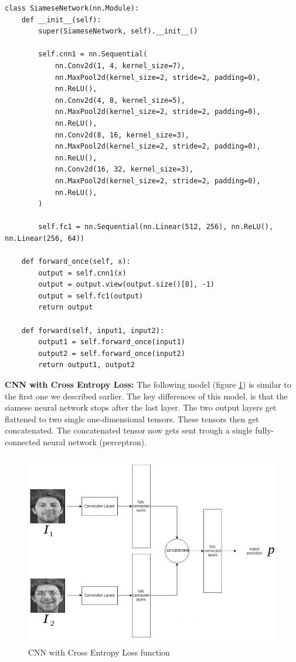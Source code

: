 \begin{lstlisting}[caption={Code for CNN with Contrastive Loss}, label={lst:cnncl}, frame=single, breaklines=true]
class SiameseNetwork(nn.Module):
    def __init__(self):
        super(SiameseNetwork, self).__init__()

        self.cnn1 = nn.Sequential(
            nn.Conv2d(1, 4, kernel_size=7),
            nn.MaxPool2d(kernel_size=2, stride=2, padding=0),
            nn.ReLU(),
            nn.Conv2d(4, 8, kernel_size=5),
            nn.MaxPool2d(kernel_size=2, stride=2, padding=0),
            nn.ReLU(),
            nn.Conv2d(8, 16, kernel_size=3),
            nn.MaxPool2d(kernel_size=2, stride=2, padding=0),
            nn.ReLU(),
            nn.Conv2d(16, 32, kernel_size=3),
            nn.MaxPool2d(kernel_size=2, stride=2, padding=0),
            nn.ReLU(),
        )

        self.fc1 = nn.Sequential(nn.Linear(512, 256), nn.ReLU(), nn.Linear(256, 64))

    def forward_once(self, x):
        output = self.cnn1(x)
        output = output.view(output.size()[0], -1)
        output = self.fc1(output)
        return output

    def forward(self, input1, input2):
        output1 = self.forward_once(input1)
        output2 = self.forward_once(input2)
        return output1, output2
\end{lstlisting}

\textbf{CNN with Cross Entropy Loss:} The following model (figure \ref{fig:cnncel}) is similar to the first one we described earlier. The key differences of this model, is that the siamese neural network stops after the last layer. The two output layers get flattened to two single one-dimensional tensors. These tensors then get concatenated. The concatenated tensor now gets sent trough a single fully-connected neural network (perceptron).\\

\begin{figure}[H]
  \includegraphics[scale=0.7]{fig/cnncel.png}
  \centering
  \caption{CNN with Cross Entropy Loss function}
  \label{fig:cnncel}
\end{figure}

